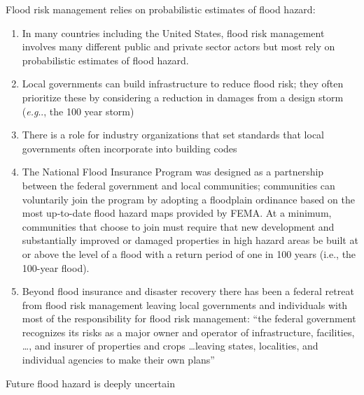 \documentclass[12pt]{article}
\makeatletter
\DeclareRobustCommand\onedot{\futurelet\@let@token\@onedot}
\def\@onedot{\ifx\@let@token.\else.\null\fi\xspace}
\def\eg{\emph{e.g}\onedot} \def\Eg{\emph{E.g}\onedot}
\DeclareRobustCommand\onedot{\futurelet\@let@token\@onedot}
\def\@onedot{\ifx\@let@token.\else.\null\fi\xspace}
\def\eg{\emph{e.g}\onedot} \def\Eg{\emph{E.g}\onedot}
\makeatother
\begin{document}
Flood risk management relies on probabilistic estimates of flood hazard:
\begin{enumerate}
    \item In many countries including the United States, flood risk management involves many different public and private sector actors but most rely on probabilistic estimates of flood hazard.
    \item Local governments can build infrastructure to reduce flood risk; they often prioritize these by considering a reduction in damages from a design storm (\eg, the 100 year storm) \citep{hcfcd_prioritization:2019}
    \item There is a role for industry organizations that set standards that local governments often incorporate into building codes \citep{asce_infrastructure_climate:2021}
    \item The National Flood Insurance Program was designed as a partnership between the federal government and local communities; communities can voluntarily join the program by adopting a floodplain ordinance based on the most up-to-date flood hazard maps provided by FEMA. At a minimum, communities that choose to join must require that new development and substantially improved or damaged properties in high hazard areas be built at or above the level of a flood with a return period of one in 100 years (i.e., the 100-year flood). \citep{kousky_voucher:2014}
    \item Beyond flood insurance and disaster recovery there has been a federal retreat from flood risk management leaving local governments and individuals with most of the responsibility for flood risk management: ``the federal government recognizes its risks as a major owner and operator of infrastructure, facilities, \ldots, and insurer of properties and crops \ldots leaving states, localities, and individual agencies to make their own plans'' \citep{shi_transformative:2021}
\end{enumerate}
Future flood hazard is deeply uncertain
\end{document}
